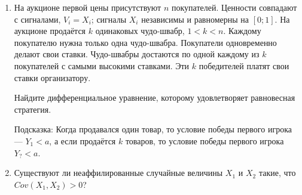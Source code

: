 \begin{enumerate}
\item На аукционе первой цены присутствуют $ n $ покупателей. Ценности совпадают с сигналами, $ V_{i}=X_{i} $; сигналы $ X_{i} $ независимы и равномерны на $ [0;1] $. На аукционе продаётся $k$ одинаковых чудо-швабр, $ 1<k<n $. Каждому покупателю нужна только одна чудо-швабра. Покупатели одновременно делают свои ставки. Чудо-швабры достаются по одной каждому из $ k $ покупателей с самыми высокими ставками. Эти $ k $ победителей платят свои ставки организатору.

Найдите дифференциальное уравнение, которому удовлетворяет равновесная стратегия.

Подсказка: Когда продавался один товар, то условие победы первого игрока — $ Y_{1}<a $, а если продаётся $ k $ товаров, то условие победы первого игрока $ Y_{?}<a $.

\item Существуют ли неаффилированные случайные величины $ X_{1} $ и $ X_{2} $ такие, что $Cov(X_{1},X_{2})>0  $?

\end{enumerate}
